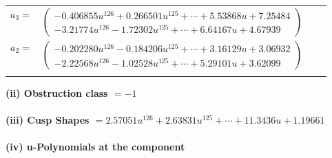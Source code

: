 \documentclass[1p]{elsarticle_modified}
\theoremstyle{definition}
\begin{document}
\begin{tabular}{m{7pt} m{180pt} m{7pt} m{180pt} }
\flushright $a_{3}=$&$\begin{pmatrix}-0.406855 u^{126}+0.266501 u^{125}+\cdots+5.53868 u+7.25484\\-3.21774 u^{126}-1.72302 u^{125}+\cdots+6.64167 u+4.67939\end{pmatrix}$ \\
\flushright $a_{2}=$&$\begin{pmatrix}-0.202280 u^{126}-0.184206 u^{125}+\cdots+3.16129 u+3.06932\\-2.22568 u^{126}-1.02528 u^{125}+\cdots+5.29101 u+3.62099\end{pmatrix}$\\&\end{tabular}
\flushleft \textbf{(ii) Obstruction class $= -1$}\\~\\
\flushleft \textbf{(iii) Cusp Shapes $= 2.57051 u^{126}+2.63831 u^{125}+\cdots+11.3436 u+1.19661$}\\~\\
\newpage\renewcommand{\arraystretch}{1}
\flushleft \textbf{(iv) u-Polynomials at the component}\newline \\
\end{document}
